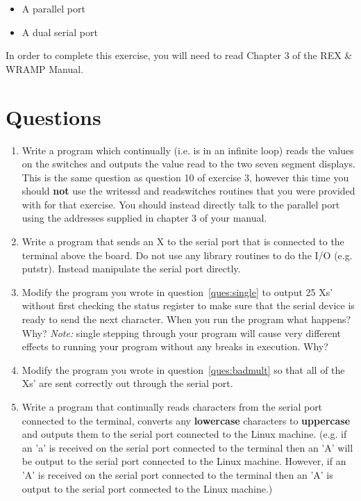 \documentclass[a4paper,10pt]{article}
\begin{document}
\begin{itemize}
\item A parallel port
\item A dual serial port
\end{itemize}

In order to complete this exercise, you will need to read Chapter 3 of the REX \& WRAMP Manual.

\section{Questions}

\begin{enumerate}

\item Write a program which continually (i.e. is in an infinite loop)
reads the values on the switches and outputs the value read to the two
seven segment displays. This is the same question as question 10 of
exercise 3, however this time you should \textbf{not} use the writessd
and readswitches routines that you were provided with for that
exercise. You should instead directly talk to the parallel port using
the addresses supplied in chapter 3 of your manual.

\item 
\label{ques:single}

Write a program that sends an X to the serial port that is
connected to the terminal above the board. Do not use any library
routines to do the I/O (e.g. putstr). Instead manipulate the serial
port directly.

\item 
\label{ques:badmult}
Modify the program you wrote in question~\ref{ques:single} to output
25 Xs' without first checking the status register to make sure that
the serial device is ready to send the next character. When you run
the program what happens?  Why? \textit{Note:} single stepping through
your program will cause very different effects to running your program
without any breaks in execution. Why?

\item Modify the program you wrote in question~\ref{ques:badmult} so
that all of the Xs' are sent correctly out through the serial port.

\item 
\label{ques:upperlower}
Write a program that continually reads characters from the serial port
connected to the terminal, converts any \textbf{lowercase} characters
to \textbf{uppercase} and outputs them to the serial port connected to
the Linux machine. (e.g. if an 'a' is received on the serial port
connected to the terminal then an 'A' will be output to the serial
port connected to the Linux machine. However, if an 'A' is received on
the serial port connected to the terminal then an 'A' is output to the
serial port connected to the Linux machine.)


\end{enumerate}
\end{document}
